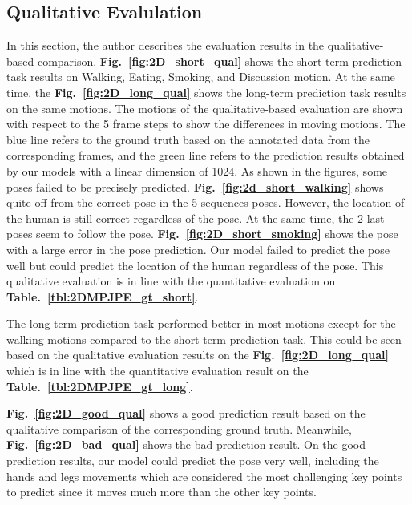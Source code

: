\subsection{Qualitative Evalulation}\label{4:2Dqualitative}
In this section, the author describes the evaluation results in the qualitative-based comparison. 
\textbf{Fig.~\ref{fig:2D_short_qual}} shows the short-term prediction task results on Walking, Eating, Smoking, and Discussion motion. At the same time, the \textbf{Fig.~\ref{fig:2D_long_qual}} shows the long-term prediction task results on the same motions. The motions of the qualitative-based evaluation are shown with respect to the 5 frame steps to show the differences in moving motions. The blue line refers to the ground truth based on the annotated data from the corresponding frames, and the green line refers to the prediction results obtained by our models with a linear dimension of 1024. As shown in the figures, some poses failed to be precisely predicted. \textbf{Fig.~\ref{fig:2d_short_walking}} shows quite off from the correct pose in the 5 sequences poses. However, the location of the human is still correct regardless of the pose. At the same time, the 2 last poses seem to follow the pose. 
\textbf{Fig.~\ref{fig:2D_short_smoking}} shows the pose with a large error in the pose prediction. Our model failed to predict the pose well but could predict the location of the human regardless of the pose. This qualitative evaluation is in line with the quantitative evaluation on \textbf{Table.~\ref{tbl:2DMPJPE_gt_short}}.

The long-term prediction task performed better in most motions except for the walking motions compared to the short-term prediction task. This could be seen based on the qualitative evaluation results on the \textbf{Fig.~\ref{fig:2D_long_qual}} which is in line with the quantitative evaluation result on the \textbf{Table.~\ref{tbl:2DMPJPE_gt_long}}.

\textbf{Fig.~\ref{fig:2D_good_qual}} shows a good prediction result based on the qualitative comparison of the corresponding ground truth. Meanwhile, \textbf{Fig.~\ref{fig:2D_bad_qual}} shows the bad prediction result. On the good prediction results, our model could predict the pose very well, including the hands and legs movements which are considered the most challenging key points to predict since it moves much more than the other key points.

